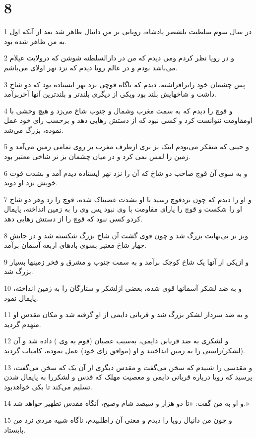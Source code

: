 \chapter{8}

\par 1 در سال سوم سلطنت بلشصر پادشاه، رویایی بر من دانیال ظاهر شد بعد از آنکه اول به من ظاهر شده بود.
\par 2 و در رویا نظر کردم ومی دیدم که من در دارالسلطنه شوشن که درولایت عیلام می‌باشد بودم و در عالم رویا دیدم که نزد نهر اولای می‌باشم.
\par 3 پس چشمان خود رابرافراشته، دیدم که ناگاه قوچی نزد نهر ایستاده بود که دو شاخ داشت و شاخهایش بلند بود ویکی از دیگری بلندتر و بلندترین آنها آخربرآمد.
\par 4 و قوچ را دیدم که به سمت مغرب وشمال و جنوب شاخ می‌زد و هیچ وحشی با اومقاومت نتوانست کرد و کسی نبود که از دستش رهایی دهد و برحسب رای خود عمل نموده، بزرگ می‌شد.
\par 5 و حینی که متفکر می‌بودم اینک بز نری ازطرف مغرب بر روی تمامی زمین می‌آمد و زمین را لمس نمی کرد و در میان چشمان بز نر شاخی معتبر بود.
\par 6 و به سوی آن قوچ صاحب دو شاخ که آن را نزد نهر ایستاده دیدم آمد و بشدت قوت خویش نزد او دوید.
\par 7 و او را دیدم که چون نزدقوچ رسید با او بشدت غضبناک شده، قوچ را زد وهر دو شاخ او را شکست و قوچ را یارای مقاومت با وی نبود پس وی را به زمین انداخته، پایمال کردو کسی نبود که قوچ را از دستش رهایی دهد.
\par 8 وبز نر بی‌نهایت بزرگ شد و چون قوی گشت آن شاخ بزرگ شکسته شد و در جایش چهار شاخ معتبر بسوی بادهای اربعه آسمان برآمد.
\par 9 و ازیکی از آنها یک شاخ کوچک برآمد و به سمت جنوب و مشرق و فخر زمینها بسیار بزرگ شد.
\par 10 و به ضد لشکر آسمانها قوی شده، بعضی ازلشکر و ستارگان را به زمین انداخته، پایمال نمود.
\par 11 و به ضد سردار لشکر بزرگ شد و قربانی دایمی از او گرفته شد و مکان مقدس او منهدم گردید.
\par 12 و لشکری به ضد قربانی دایمی، به‌سبب عصیان (قوم به وی ) داده شد و آن (لشکر)راستی را به زمین انداختند و او (موافق رای خود) عمل نموده، کامیاب گردید.
\par 13 و مقدسی را شنیدم که سخن می‌گفت و مقدس دیگری از آن یک که سخن می‌گفت، پرسید که رویا درباره قربانی دایمی و معصیت مهلک که قدس و لشکررا به پایمال شدن تسلیم می‌کند تا بکی خواهدبود.
\par 14 و او به من گفت: «تا دو هزار و سیصد شام وصبح، آنگاه مقدس تطهیر خواهد شد.»
\par 15 و چون من دانیال رویا را دیدم و معنی آن راطلبیدم، ناگاه شبیه مردی نزد من بایستاد.
